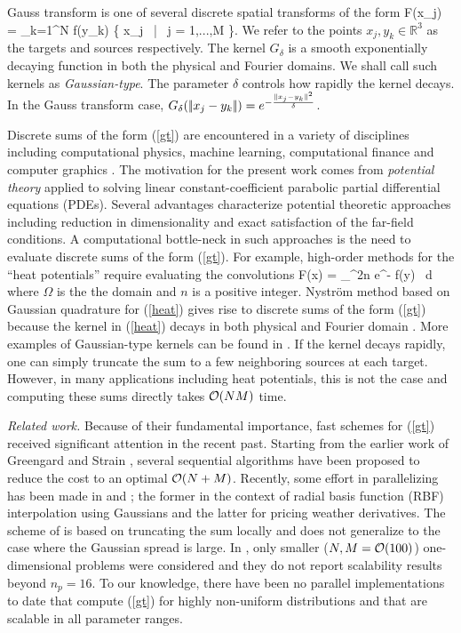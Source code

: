 
Gauss transform is one of several discrete spatial transforms of the form 
%
\beq F(x_j) = \sum_{k=1}^N  f(y_k) \quad {} \quad \{ x_j \, | \, j = 1,...,M \}.  \label{gt} \eeq
%
We refer to the points $ x_j, y_k \in \mathbb{R}^3 $ as the targets and sources respectively. The kernel $G_\delta$ is a
 smooth exponentially decaying function in both the physical and Fourier domains. We shall call such kernels as {\em Gaussian-type}.
  The parameter $\delta$ controls how rapidly the kernel decays.  In the Gauss transform case, $G_\delta (|\!| x_j - y_k |\!|) = e^{-\frac{|\!| x_j - y_k |\!|^2}{\delta}}$. 

Discrete sums of the form (\ref{gt}) are encountered in a variety of disciplines including computational physics,
 machine learning, computational finance and computer graphics \cite{strain94adap, elgammal03, broadie03, kim05, veerapaneni08}. The
 motivation for the present work comes from {\em potential theory} \cite{kress99} applied to  solving linear constant-coefficient
 parabolic partial differential equations (PDEs). Several advantages characterize potential theoretic approaches including reduction
 in dimensionality and exact satisfaction of the far-field conditions. A computational bottle-neck in such approaches is the need to 
 evaluate discrete sums of the form (\ref{gt}). For example, high-order methods for the ``heat potentials'' require evaluating the convolutions \cite{li09, skv09}
% 
\beq F(x) = \int_\Omega {}^{2n} e^{-} f(y) \, d\Omega \label{heat} \eeq
% 
where $\Omega$ is the the domain and $n$ is a positive integer. Nystr\"{o}m method based on Gaussian quadrature for (\ref{heat}) 
gives rise to discrete sums of the form (\ref{gt}) because the kernel in (\ref{heat}) decays in both physical and Fourier 
domain \cite{fggt}. More examples of Gaussian-type kernels can be found in \cite{victor03}. If the kernel decays rapidly, one 
can simply truncate the sum to a few neighboring sources at each target. However, in many applications including heat potentials, this
 is not the case and computing these sums directly takes $\mathcal{O}(NM)$ time. 

{\em Related work.} Because of their fundamental importance, fast schemes for (\ref{gt}) received significant attention in 
the recent past. Starting from the earlier work of Greengard and Strain \cite{fgt}, several sequential
 algorithms \cite{greengard98, sun02, duraiswami03, tausch09, fggt} have been proposed to reduce the cost to an optimal $\mathcal{O}(N+M)$. Recently,
  some effort in parallelizing has been made in \cite{rio09} and \cite{yusaku06}; the former in the context of radial basis 
  function (RBF) interpolation using Gaussians and the latter for pricing weather derivatives. The scheme of \cite{rio09} is based on 
  truncating the sum locally and does not generalize to the case where the Gaussian spread is large. In \cite{yusaku06}, only
   smaller ($N, M = \mathcal{O}(100)$) one-dimensional problems were considered and they do not report scalability results beyond $n_p = 16$. 
To our knowledge, there have been no parallel implementations to date that compute (\ref{gt}) for highly non-uniform
 distributions and that are scalable in all parameter ranges. 

